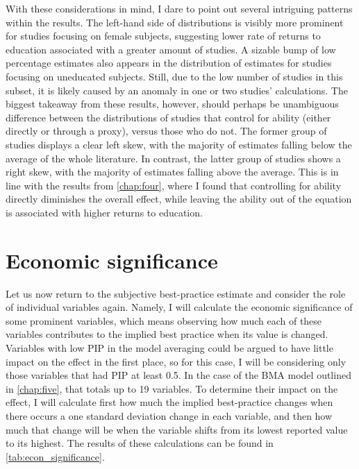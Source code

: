 With these considerations in mind, I dare to point out several intriguing patterns within the results. The left-hand side of distributions is visibly more prominent for studies focusing on female subjects, suggesting lower rate of returns to education associated with a greater amount of studies. A sizable bump of low percentage estimates also appears in the distribution of estimates for studies focusing on uneducated subjects. Still, due to the low number of studies in this subset, it is likely caused by an anomaly in one or two studies' calculations. The biggest takeaway from these results, however, should perhaps be unambiguous difference between the distributions of studies that control for ability (either directly or through a proxy), versus those who do not. The former group of studies displays a clear left skew, with the majority of estimates falling below the average of the whole literature. In contrast, the latter group of studies shows a right skew, with the majority of estimates falling above the average. This is in line with the results from \autoref{chap:four}, where I found that controlling for ability directly diminishes the overall effect, while leaving the ability out of the equation is associated with higher returns to education.

\section{Economic significance}
\label{sec:economic_significance}

Let us now return to the subjective best-practice estimate and consider the role of individual variables again. Namely, I will calculate the economic significance of some prominent variables, which means observing how much each of these variables contributes to the implied best practice when its value is changed. Variables with low \ac{PIP} in the model averaging could be argued to have little impact on the effect in the first place, so for this case, I will be considering only those variables that had \ac{PIP} at least 0.5. In the case of the \ac{BMA} model outlined in \autoref{chap:five}, that totals up to 19 variables. To determine their impact on the effect, I will calculate first how much the implied best-practice changes when there occurs a one standard deviation change in each variable, and then how much that change will be when the variable shifts from its lowest reported value to its highest. The results of these calculations can be found in \autoref{tab:econ_significance}.

